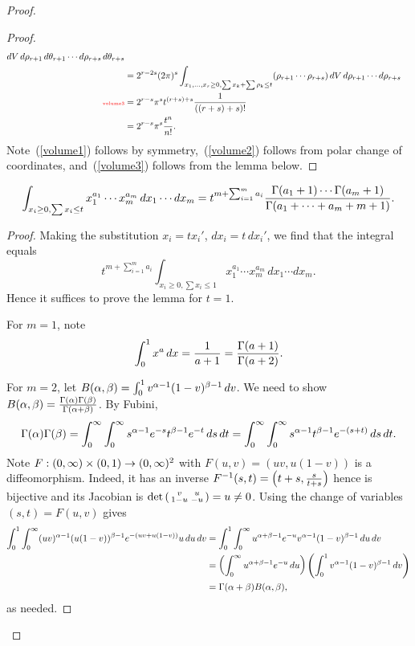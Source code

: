 \begin{proof}
\begin{proof}
\begin{align}
dV\,d\rh_{r+1}\,d\theta_{r+1}\cdots d\rh_{r+s}\,d\te_{r+s}\\
\nonumber &=2^{r-2s} (2\pi)^s\int_{x_1,\ldots, x_r\ge 0, \sum x_k+\sum \rh_k\le t}(\rh_{r+1}\cdots \rh_{r+s})\,
dV\,d\rh_{r+1}\cdots d\rh_{r+s}\\
\llabel{volume3}&=2^{r-s}\pi^st^{(r+s)+s}\frac{1}{((r+s)+s)!}\\
\nonumber  &=2^{r-s}\pi^s\frac{t^n}{n!}.
\end{align}
Note~(\ref{volume1}) follows by symmetry,~(\ref{volume2}) follows from polar change of coordinates, and~(\ref{volume3}) follows from the lemma below.
\end{proof}
\begin{lem}
\[
\int_{x_i\ge 0,\sum x_i\le t} x_1^{a_1}\cdots x_m^{a_m}\,dx_1\cdots dx_m=t^{m+\sum_{i=1}^m a_i} \frac{\Gamma(a_1+1)\cdots \Gamma(a_m+1)}{\Gamma(a_1+\cdots +a_m+m+1)}.
\]
\end{lem}
\begin{proof}
Making the substitution $x_i=tx_i'$, $dx_i=t \,dx_i'$, we find that the integral equals
\[
t^{m+\sum_{i=1}^m a_i} \int_{x_i\ge 0,\sum x_i\le 1} x_1^{a_1}\cdots x_m^{a_m}\,dx_1\cdots dx_m.
\]
Hence it suffices to prove the lemma for $t=1$.

For $m=1$, note
\[
\int_0^1 x^a\,dx=\frac{1}{a+1}=\frac{\Gamma(a+1)}{\Gamma(a+2)}.
\]

For $m=2$, let $B(\alpha,\beta)=\int_0^1 v^{\alpha-1} (1-v)^{\beta-1}\,dv$. We need to show $B(\alpha,\beta)=\frac{\Gamma(\alpha)\Gamma(\beta)}{\Gamma(\alpha+\beta)}$. 
By Fubini,
\[
\Gamma(\alpha)\Gamma(\beta)=\int_0^{\infty} \int_0^{\infty} s^{\alpha-1}e^{-s}t^{\beta-1}e^{-t}\,ds\,dt
=\int_0^{\infty}\int_0^{\infty} s^{\alpha-1}t^{\beta-1} e^{-(s+t)}\,ds\,dt.
\]
Note $F: (0,\infty)\times (0,1)\to (0,\infty)^2$ with $F(u,v)=(uv,u(1-v))$ is a diffeomorphism. Indeed, it has an inverse $F^{-1}(s,t)=\left( {t+s,\frac{s}{t+s}} \right)$ hence is bijective and its Jacobian is $\det\left(\begin{smallmatrix} {v}&{u}\\ {1-u}&{-u} \end{smallmatrix}\right)=u\ne0$. Using the change of variables $(s,t)=F(u,v)$ gives
\begin{align*}
\int_0^1\int_0^{\infty} (uv)^{\alpha-1} (u(1-v))^{\beta-1} e^{-(uv+u(1-v))}u\,du\,dv
&=\int_0^1\int_0^{\infty}u^{\alpha+\beta-1} e^{-u} v^{\alpha-1} (1-v)^{\beta-1}\,du\,dv\\
&=\left( {\int_0^{\infty}u^{\alpha+\beta-1} e^{-u}\,du} \right)\left( {\int_0^1 v^{\alpha-1} (1-v)^{\beta-1}\,dv} \right)\\
&=\Gamma(\alpha+\beta)B(\alpha,\beta),
\end{align*}
as needed.


\end{proof}
\end{proof}
